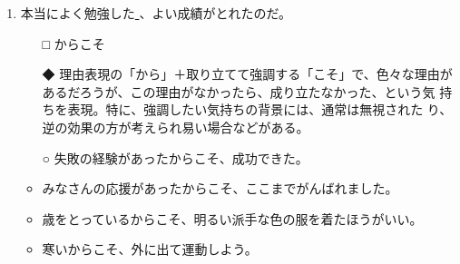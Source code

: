 \documentclass[
uplatex,
b5paper,
10pt,
dvipdfmx
]{jsbook}
\begin{document}
\begin{enumerate}
\item 本当によく勉強した\underline{    }、よい成績がとれたのだ。
\begin{itemize}
\item[□] からこそ
\item[◆] 理由表現の「から」＋取り立てて強調する「こそ」で、色々な理由が
	  あるだろうが、この理由がなかったら、成り立たなかった、という気
	  持ちを表現。特に、強調したい気持ちの背景には、通常は無視された
	  り、逆の効果の方が考えられ易い場合などがある。
\end{itemize}
\begin{itemize}
\item[○] 失敗の経験があったからこそ、成功できた。
\item みなさんの応援があったからこそ、ここまでがんばれました。
\item 歳をとっているからこそ、明るい派手な色の服を着たほうがいい。
\item 寒いからこそ、外に出て運動しよう。
\end{itemize}

\end{enumerate}
\end{document}
